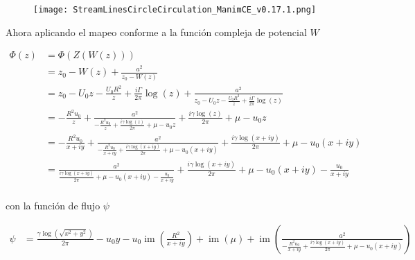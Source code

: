 \documentclass[12pt]{article}
\begin{document}
			\begin{figure}[!h]
				\begin{small}
					\begin{center}
						\texttt{[image: StreamLinesCircleCirculation\_ManimCE\_v0.17.1.png]}
					\end{center}
					\caption{}
					\label{fig:}
				\end{small}
			\end{figure}
			

			Ahora aplicando el mapeo conforme a la función compleja de potencial $W$

			\begin{equation}
				\begin{split}
				\Phi(z) &= \Phi(Z(W(z)))\\ 
						&=z_0-W(z)+\frac{a^2}{z_0-W(z)} \\
						&= z_0-U_0z - \frac{ U_0R^2}{z} + \frac{i \Gamma}{2 \pi}\log (z)+\frac{a^2}{z_0-U_0z - \frac{ U_0R^2}{z} + \frac{i \Gamma}{2 \pi}\log (z)}\\
						&=- \frac{R^{2} u_{0}}{z} + \frac{a^{2}}{- \frac{R^{2} u_{0}}{z} + \frac{i \gamma \log{\left(z \right)}}{2 \pi} + \mu - u_{0} z} + \frac{i \gamma \log{\left(z \right)}}{2 \pi} + \mu - u_{0} z\\
						&=- \frac{R^{2} u_{0}}{x + i y} + \frac{a^{2}}{- \frac{R^{2} u_{0}}{x + i y} + \frac{i \gamma \log{\left(x + i y \right)}}{2 \pi} + \mu - u_{0} \left(x + i y\right)} + \frac{i \gamma \log{\left(x + i y \right)}}{2 \pi} + \mu - u_{0} \left(x + i y\right)\\
						&=\frac{a^{2}}{\frac{i \gamma \log{\left(x + i y \right)}}{2 \pi} + \mu - u_{0} \left(x + i y\right) - \frac{u_{0}}{x + i y}} + \frac{i \gamma \log{\left(x + i y \right)}}{2 \pi} + \mu - u_{0} \left(x + i y\right) - \frac{u_{0}}{x + i y}\\
				\end{split}	
			\end{equation}

			con la función de flujo $\psi$
			
			\begin{equation}
				\begin{split}
				\psi &= \frac{\gamma \log{\left(\sqrt{x^{2} + y^{2}} \right)}}{2 \pi} - u_{0} y - u_{0} \operatorname{im}{\left(\frac{R^{2}}{x + i y}\right)} + \operatorname{im}{\left(\mu\right)} + \operatorname{im}{\left(\frac{a^{2}}{- \frac{R^{2} u_{0}}{x + i y} + \frac{i \gamma \log{\left(x + i y \right)}}{2 \pi} + \mu - u_{0} \left(x + i y\right)}\right)}\\
				\label{eq:}
				\end{split}	
			\end{equation}
\end{document}
